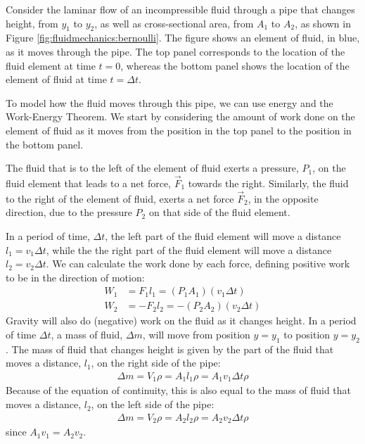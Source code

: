 {{Consider the laminar flow of an incompressible fluid through a pipe that changes height, from $y_1$ to $y_2$, as well as cross-sectional area, from $A_1$ to $A_2$, as shown in Figure \ref{fig:fluidmechanics:bernoulli}. The figure shows an element of fluid, in blue, as it moves through the pipe. The top panel corresponds to the location of the fluid element at time $t=0$, whereas the bottom panel shows the location of the element of fluid at time $t=\Delta t$.

To model how the fluid moves through this pipe, we can use energy and the Work-Energy Theorem. We start by considering the amount of work done on the element of fluid as it moves from the position in the top panel to the position in the bottom panel. 

The fluid that is to the left of the element of fluid exerts a pressure, $P_1$, on the fluid element that leads to a net force, $\vec F_1$ towards the right. Similarly, the fluid to the right of the element of fluid, exerts a net force $\vec F_2$, in the opposite direction, due to the pressure $P_2$ on that side of the fluid element.

In a period of time, $\Delta t$, the left part of the fluid element will move a distance $l_1 = v_1 \Delta t$, while the the right part of the fluid element will move a distance $l_2=v_2\Delta t$. We can calculate the work done by each force, defining positive work to be in the direction of motion:
\begin{align*}
W_1 &=  F_1l_1 = (P_1A_1)(v_1 \Delta t)\\
W_2 &= -F_2l_2 = -(P_2A_2)(v_2 \Delta t)
\end{align*}
Gravity will also do (negative) work on the fluid as it changes height. In a period of time $\Delta t$, a mass of fluid, $\Delta m$, will move from position $y=y_1$ to position $y=y_2$. The mass of fluid that changes height is given by the part of the fluid that moves a distance, $l_1$, on the right side of the pipe:
\begin{align*}
\Delta m = V_1 \rho = A_1 l_1 \rho = A_1 v_1 \Delta t \rho 
\end{align*}
Because of the equation of continuity, this is also equal to the mass of fluid that moves a distance, $l_2$, on the left side of the pipe:
\begin{align*}
\Delta m = V_2 \rho = A_2 l_2 \rho = A_2 v_2 \Delta t \rho 
\end{align*}
since $A_1v_1 = A_2 v_2$.

}}
